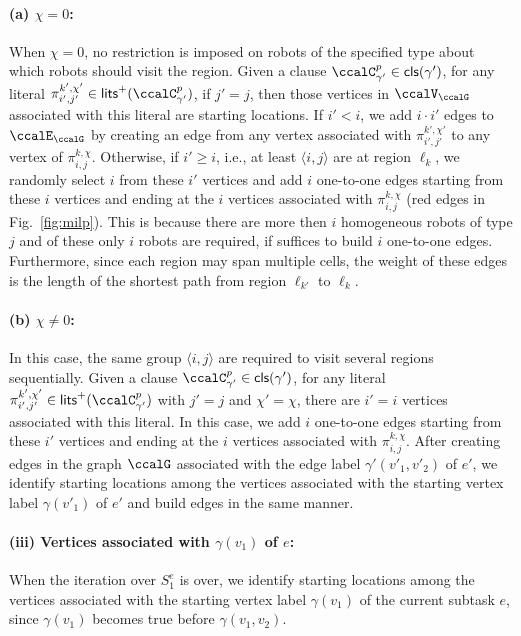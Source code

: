 \documentclass[Afour,sageh,times]{sagej}
\newcommand{\clause}[1]{\mathsf{cls}(#1)}
\newcommand{\ag}[2]{\langle#1,#2\rangle}
\renewcommand{\ap}[3]{\mathcal{\pi}_{{#1},{#2}}^{#3}}
\begin{document}
  \paragraph{(a) $\chi = 0$:} When $\chi=0$, no restriction is imposed on robots of the specified type about which robots should visit the region.  Given a clause $\ccalC_{\gamma'}^p \in \clause{\gamma'}$, for any literal $\ap{i'}{j'}{k',\chi'} \in\mathsf{lits}^+(\ccalC_{\gamma'}^p)$, if $j'=j$, then those vertices in $\ccalV_\ccalG$ associated with this literal are starting locations. If $i'<i$, we add $i\cdot  i'$ edges to $\ccalE_\ccalG$ by creating an edge from any vertex associated with $\ap{i'}{j'}{k',\chi'}$ to any vertex of $\ap{i}{j}{k,\chi}$. Otherwise, if $i' \geq  i$, i.e., at least $\ag{i}{j}$ are at region $\ell_k$, we randomly select $i$ from these $i'$ vertices and add $i$ one-to-one edges starting from these $i$ vertices and ending at the $i$ vertices associated with $\ap{i}{j}{k,\chi}$ (red edges in Fig.~\ref{fig:milp}). This is because there are more then $i$ homogeneous robots of type $j$ and of these only $i$ robots are required, if suffices to build $i$ one-to-one edges. Furthermore, since each region may span multiple cells, the weight of these edges is the length of the shortest path from region  $\ell_{k'}$ to $\ell_k$. %

  \paragraph{(b) $\chi \not=0$:} In this case, the same group $\ag{i}{j}$ are required to visit several regions sequentially.
  Given a clause $\ccalC_{\gamma'}^p \in \clause{\gamma'}$, for any literal $\ap{i'}{j'}{k',\chi'} \in\mathsf{lits}^+(\ccalC_{\gamma'}^p)$ with $j'=j$ and $\chi'=\chi$, there are $i'=i$ vertices associated with this literal. In this case, we add $i$ one-to-one edges starting from these $i'$ vertices and ending at the $i$ vertices associated with $\ap{i}{j}{k,\chi}$. After creating edges in the graph $\ccalG$ associated with the edge label  $\gamma'(v'_1,v'_2)$ of $e'$, we identify  starting locations among the vertices associated with the starting vertex label $\gamma(v'_1)$ of $e'$ and build edges in the same manner.
\paragraph{(iii) Vertices associated with $\gamma(v_1)$ of $e$:}\label{sec:c} When the iteration over $S_1^e$ is over, we identify  starting locations among the vertices associated with the starting vertex label  $\gamma(v_1)$ of the current subtask $e$, since $\gamma(v_1)$  becomes true before $\gamma(v_1, v_2)$.
\end{document}
